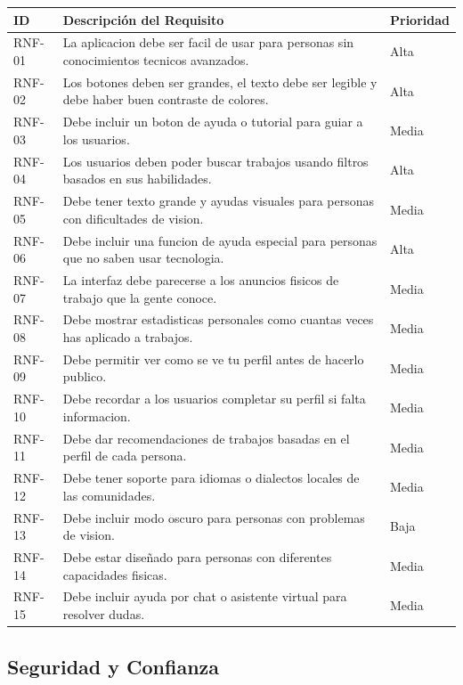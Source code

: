 \documentclass[12pt, a4paper]{article}
\begin{document}
\begin{longtable}{|P{2cm}|P{10cm}|P{2cm}|}
\hline
\textbf{ID} & \textbf{Descripción del Requisito} & \textbf{Prioridad} \\
\hline
\endhead

RNF-01 & La aplicacion debe ser facil de usar para personas sin conocimientos tecnicos avanzados. & Alta \\
\hline
RNF-02 & Los botones deben ser grandes, el texto debe ser legible y debe haber buen contraste de colores. & Alta \\
\hline
RNF-03 & Debe incluir un boton de ayuda o tutorial para guiar a los usuarios. & Media \\
\hline
RNF-04 & Los usuarios deben poder buscar trabajos usando filtros basados en sus habilidades. & Alta \\
\hline
RNF-05 & Debe tener texto grande y ayudas visuales para personas con dificultades de vision. & Media \\
\hline
RNF-06 & Debe incluir una funcion de ayuda especial para personas que no saben usar tecnologia. & Alta \\
\hline
RNF-07 & La interfaz debe parecerse a los anuncios fisicos de trabajo que la gente conoce. & Media \\
\hline
RNF-08 & Debe mostrar estadisticas personales como cuantas veces has aplicado a trabajos. & Media \\
\hline
RNF-09 & Debe permitir ver como se ve tu perfil antes de hacerlo publico. & Media \\
\hline
RNF-10 & Debe recordar a los usuarios completar su perfil si falta informacion. & Media \\
\hline
RNF-11 & Debe dar recomendaciones de trabajos basadas en el perfil de cada persona. & Media \\
\hline
RNF-12 & Debe tener soporte para idiomas o dialectos locales de las comunidades. & Media \\
\hline
RNF-13 & Debe incluir modo oscuro para personas con problemas de vision. & Baja \\
\hline
RNF-14 & Debe estar diseñado para personas con diferentes capacidades fisicas. & Media \\
\hline
RNF-15 & Debe incluir ayuda por chat o asistente virtual para resolver dudas. & Media \\
\hline
\end{longtable}

\subsection{Seguridad y Confianza}
\end{document}

